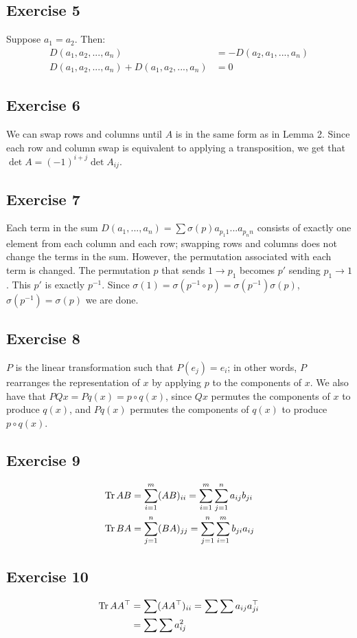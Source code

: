 \subsection{Exercise 5}
Suppose $a_1 = a_2$. Then:
\begin{align*}
        D(a_1, a_2, ..., a_n) &= -D(a_2, a_1, ..., a_n) \\
        D(a_1, a_2, ..., a_n) + D(a_1, a_2, ..., a_n) &= 0
\end{align*}

\subsection{Exercise 6}
We can swap rows and columns until $A$ is in the same form as in Lemma 2.
Since each row and column swap is equivalent to applying a transposition,
we get that $\det A = (-1)^{i + j} \det A_{ij}$.

\subsection{Exercise 7}
Each term in the sum $D(a_1, ..., a_n) = \sum \sigma(p) a_{p_1 1} ... a_{p_n n}$ consists of
exactly one element from each column and each row; swapping rows and columns does not
change the terms in the sum. However, the permutation associated with each term is changed.
The permutation $p$ that sends $1 \to p_1$ becomes $p'$ sending $p_1 \to 1$. This $p'$ 
is exactly $p^{-1} $. Since $\sigma(1) = \sigma(p^{-1}  \circ p) = \sigma(p^{-1}) \sigma(p)$, 
$\sigma(p^{-1}) = \sigma(p)$ we are done.

\subsection{Exercise 8}
$P$ is the linear transformation such that $P(e_j) = e_i$; in other words,
$P$ rearranges the representation of $x$ by applying $p$ to the components of $x$.
We also have that $PQx = P q(x) = p \circ q(x)$, since $Qx$ permutes the components
of $x$ to produce $q(x)$, and $P q(x)$ permutes the components of $q(x)$ to produce
$p \circ q(x)$.

\subsection{Exercise 9}
\begin{align*}
        &\Tr AB = \sum_{i = 1}^m (AB)_{ii} = \sum_{i=1}^m \sum_{j=1}^n a_{ij}b_{ji} \\
        &\Tr BA = \sum_{j=1}^n (BA)_{jj} = \sum_{j=1}^n \sum_{i=1}^m b_{ji} a_{ij}
\end{align*}

\subsection{Exercise 10}
\begin{align*}
        \Tr A A^{\top} &= \sum (A A^{\top})_{ii} = \sum \sum a_{ij} a^{\top}_{ji} \\
                       &= \sum \sum a_{ij}^2
\end{align*}

